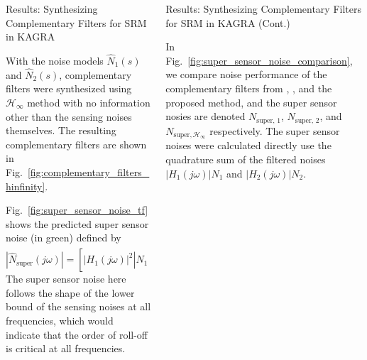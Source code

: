 \documentclass{beamer}
\begin{document}
\begin{frame}[t]
\begin{columns}[t]
\begin{column}{0.32\linewidth}
\begin{block}{Results: Synthesizing Complementary Filters for SRM in KAGRA}
				\medskip
				
				With the noise models $\hat{N}_1(s)$ and $\hat{N}_2(s)$, complementary filters were synthesized using $\mathcal{H}_\infty$ method with no information other than the sensing noises themselves.
				The resulting complementary filters are shown in Fig.~\ref{fig:complementary_filters_hinfinity}.
				
				\medskip
				
				Fig.~\ref{fig:super_sensor_noise_tf} shows the predicted super sensor noise (in green) defined by
				\begin{equation}
					\left\vert \hat{N}_\text{super}(j\omega)\right\vert = \left[\left\vert H_1(j\omega)\right\vert^2\left\vert \hat{N}_1(j\omega)\right\vert^2 + \left\vert H_2(j\omega)\right\vert^2\left\vert \hat{N}_2(j\omega)\right\vert^2\right]^{\frac{1}{2}}\,.
				\end{equation}
				The super sensor noise here follows the shape of the lower bound of the sensing noises at all frequencies, which would indicate that the order of roll-off is critical at all frequencies.
			\end{block}
		\end{column}
	
		\begin{column}{0.32\linewidth}
			\begin{block}{Results: Synthesizing Complementary Filters for SRM in KAGRA (Cont.)}
				
			In Fig.~\ref{fig:super_sensor_noise_comparison}, we compare noise performance of the complementary filters from \cite{Sekiguchi:2016bmv}, \cite{vanHeijningen:2018cpc}, and the proposed method, and the super sensor nosies are denoted $N_\text{super, 1}$, $N_\text{super, 2}$, and $N_{\text{super},\mathcal{H}_\infty}$ respectively.
			The super sensor noises were calculated directly use the quadrature sum of the filtered noises $\vert H_1(j\omega)\vert N_1$ and $\vert H_2(j\omega)\vert N_2$.
			

\end{block}
\end{column}
\end{columns}
\end{frame}
\end{document}
